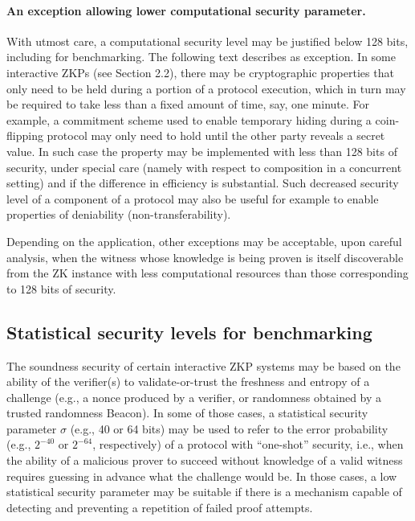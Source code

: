 \paragraph{An exception allowing lower computational security parameter.}
\label{par:security:efficiency:comp-sec-levels:exception}
	With utmost care, a computational security level may be justified below 128 bits, including for benchmarking.
	The following text describes as exception.
	In some interactive ZKPs (see Section 2.2), there may be cryptographic properties that only need to be held during a portion of a protocol execution, which in turn may be required to take less than a fixed amount of time, say, one minute.
	For example, a commitment scheme used to enable temporary hiding during a coin-flipping protocol may only need to hold until the other party reveals a secret value.
	In such case the property may be implemented with less than 128 bits of security, under special care (namely with respect to composition in a concurrent setting) and if the difference in efficiency is substantial.
	Such decreased security level of a component of a protocol may also be useful for example to enable properties of deniability (non-transferability).

    Depending on the application, other exceptions may be acceptable, upon careful analysis, when the witness whose knowledge is being proven is itself discoverable from the ZK instance with less computational resources than those corresponding to 128 bits of security. 



\def\tmpTitle{Statistical security levels for benchmarking}
\subsection[\tmpTitle]{\tmpTitle{}}
\label{security:efficiency:stat-sec-levels}


	The soundness security of certain interactive ZKP systems may be based on the ability of the verifier(s) to validate-or-trust the freshness and entropy of a challenge (e.g., a nonce produced by a verifier, or randomness obtained by a trusted randomness Beacon).
	In some of those cases, a statistical security parameter $\sigma$ (e.g., 40 or 64 bits) may be used to refer to the error probability (e.g., $2^{-40}$ or $2^{-64}$, respectively) of a protocol with ``one-shot'' security, i.e., when the ability of a malicious prover to succeed without knowledge of a valid witness requires guessing in advance what the challenge would be.
	In those cases, a low statistical security parameter may be suitable if there is a mechanism capable of detecting and preventing a repetition of failed proof attempts.

